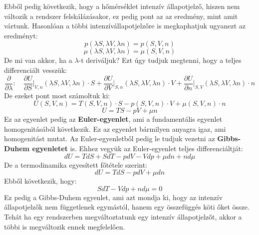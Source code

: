 \documentclass[../main.tex]{subfiles}
\begin{document}
Ebből pedig következik, hogy a hőmérséklet intenzív állapotjelző, hiszen nem változik a rendszer felskálázásakor, ez pedig pont az az eredmény, mint amit vártunk.
Hasonlóan a többi intenzívállapotjelzőre is megkaphatjuk ugyanezt az eredményt:
\begin{equation}
    p(\lambda S, \lambda V, \lambda n) = p (S, V, n)
\end{equation}
\begin{equation}
    \mu(\lambda S, \lambda V, \lambda n) = \mu (S, V, n)
\end{equation}
De mi van akkor, ha a $\lambda$-t deriváljuk? Ezt úgy tudjuk megtenni, hogy a teljes differenciált vesszük:
\begin{equation}
    \frac{\partial}{\partial \lambda}: \quad \frac{\partial U}{\partial S}\bigg|_{V,n} (\lambda S, \lambda V, \lambda n) \cdot S + \frac{\partial U}{\partial V}\bigg|_{S,n} (\lambda S, \lambda V, \lambda n) \cdot V + \frac{\partial U}{\partial n}\bigg|_{S,V} (\lambda S, \lambda V, \lambda n) \cdot n
\end{equation}
De ezeket pont most számoltuk ki:
\begin{equation}
    U(S, V, n) = T(S, V, n) \cdot S - p(S, V, n) \cdot V + \mu(S, V, n) \cdot n
\end{equation} 
\begin{equation}
    \boxed{U = T S - p V + \mu n}
\end{equation}
Ez az egyenlet pedig az \textbf{Euler-egyenlet}, ami a fundamentális egyenlet homogenitásából következik. Ez az egyenlet bármilyen anyagra igaz,
ami homogenitást mutat. Az Euler-egyenletből pedig le tudjuk vezetni az \textbf{Gibbs-Duhem egyenletet} is. Ehhez vegyük az Euler-egyenlet teljes differenciáltját:
\begin{equation}
    dU = T dS + S dT - p dV - V dp + \mu dn + n d\mu
\end{equation}
De a termodinamika egyesített főtétele szerint:
\begin{equation}
    dU = T dS - p dV + \mu dn
\end{equation}
Ebből következik, hogy:
\begin{equation}
    S dT - V dp + n d\mu = 0
\end{equation}
Ez pedig a Gibbs-Duhem egyenlet, ami azt mondja ki, hogy az intenzív állapotjelzők nem függetlenek egymástól, hanem egy összefüggés köti őket össze.
Tehát ha egy rendszerben megváltoztatunk egy intenzív állapotjelzőt, akkor a többi is megváltozik ennek megfelelően.
\end{document}
